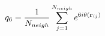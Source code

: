 \documentclass[12pt]{article}
\begin{document}
$$
   q_6 = \frac{1}{N_{neigh}}\sum_{j = 1}^{N_{neigh}} e^{6 i \theta({\bf r}_{ij})}
$$
\end{document}
